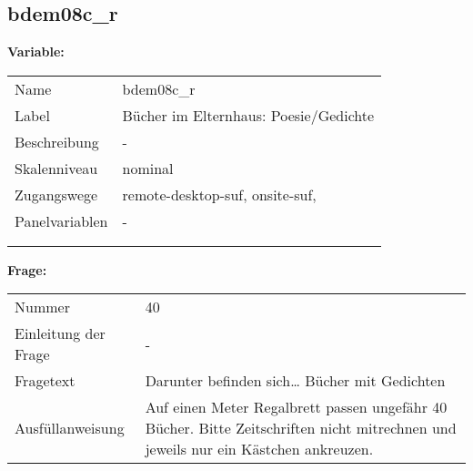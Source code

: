 	
	
	\subsection{bdem08c\_r}
	\label{subSection:bdem08c_r}

	\noindent\textbf{Variable:}\\
		\begin{tabular}{lL{11.3cm}}
			\label{tableVariable:bdem08c_r}
			Name & bdem08c\_r \\
			Label & Bücher im Elternhaus: Poesie/Gedichte \\
			Beschreibung & - \\
			Skalenniveau & nominal \\
			Zugangswege &
				remote-desktop-suf,
				onsite-suf,
 \\
			Panelvariablen & -
			 \\
			 \\
 \\
		\end{tabular}

		\vspace*{1 cm}
		\noindent\textbf{Frage:}\\
		\begin{tabular}{lL{11.3cm}}
			\label{tableQuestion:bdem08c_r}
			Nummer & 40 \\
			Einleitung der Frage & - \\
			Fragetext & Darunter befinden sich…
Bücher mit Gedichten \\
			Ausfüllanweisung & Auf einen Meter Regalbrett passen ungefähr 40 Bücher. Bitte Zeitschriften nicht mitrechnen und jeweils nur ein Kästchen ankreuzen. \\
		\end{tabular}





